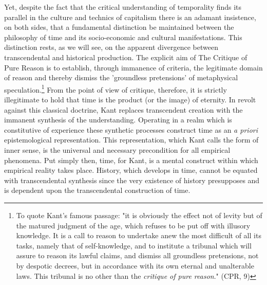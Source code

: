 Yet, despite the fact that the critical understanding of temporality finds its parallel in the culture and technics of capitalism there is an adamant insistence, on both sides, that a fundamental distinction be maintained between the philosophy of time and its socio-economic and cultural manifestations. This distinction rests, as we will see, on the apparent divergence between transcendental and historical production. The explicit aim of The Critique of Pure Reason is to establish, through immanence of criteria, the legitimate domain of reason and thereby dismiss the 'groundless pretensions' of metaphysical speculation.\footnote{To quote Kant's famous passage: "it is obviously the effect not of levity but of the matured judgment of the age, which refuses to be put off with illusory knowledge. It is a call to reason to undertake anew the most difficult of all its tasks, namely that of self-knowledge, and to institute a tribunal which will assure to reason its lawful claims, and dismiss all groundless pretensions, not by despotic decrees, but in accordance with its own eternal and unalterable laws. This tribunal is no other than the \textit{critique of pure reason}." (CPR, 9)} From the point of view of critique, therefore, it is strictly illegitimate to hold that time is the product (or the image) of eternity. In revolt against this classical doctrine, Kant replaces transcendent creation with the immanent synthesis of the understanding. Operating in a realm which is constitutive of experience these synthetic processes construct time as an \textit{a priori} epistemological representation. This representation, which Kant calls the form of inner sense, is the universal and necessary precondition for all empirical phenomena. Put simply then, time, for Kant, is a mental construct within which empirical reality takes place. History, which develops in time, cannot be equated with transcendental synthesis since the very existence of history presupposes and is dependent upon the transcendental construction of time. 

